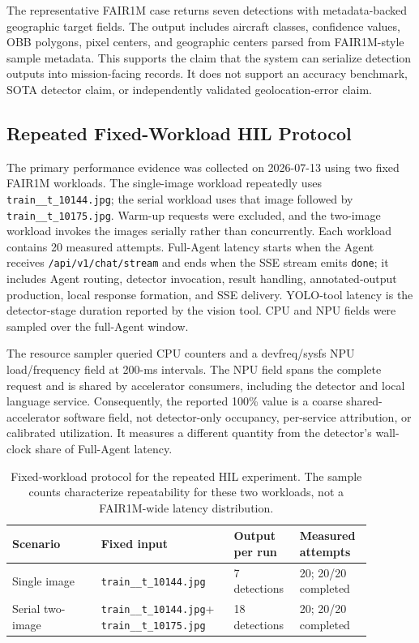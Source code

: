 The representative FAIR1M case returns seven detections with metadata-backed geographic target fields. The output includes aircraft classes, confidence values, OBB polygons, pixel centers, and geographic centers parsed from FAIR1M-style sample metadata. This supports the claim that the system can serialize detection outputs into mission-facing records. It does not support an accuracy benchmark, SOTA detector claim, or independently validated geolocation-error claim.

\subsection{Repeated Fixed-Workload HIL Protocol}

The primary performance evidence was collected on 2026-07-13 using two fixed FAIR1M workloads. The single-image workload repeatedly uses \texttt{train\_\_t\_10144.jpg}; the serial workload uses that image followed by \texttt{train\_\_t\_10175.jpg}. Warm-up requests were excluded, and the two-image workload invokes the images serially rather than concurrently. Each workload contains 20 measured attempts. Full-Agent latency starts when the Agent receives \texttt{/api/v1/chat/stream} and ends when the SSE stream emits \texttt{done}; it includes Agent routing, detector invocation, result handling, annotated-output production, local response formation, and SSE delivery. YOLO-tool latency is the detector-stage duration reported by the vision tool. CPU and NPU fields were sampled over the full-Agent window.

The resource sampler queried CPU counters and a devfreq/sysfs NPU load/frequency field at 200-ms intervals. The NPU field spans the complete request and is shared by accelerator consumers, including the detector and local language service. Consequently, the reported 100\% value is a coarse shared-accelerator software field, not detector-only occupancy, per-service attribution, or calibrated utilization. It measures a different quantity from the detector's wall-clock share of Full-Agent latency.

\begin{table}[htbp]
\centering
\small
\renewcommand{\arraystretch}{1.14}
\setlength{\tabcolsep}{3.5pt}
\caption{Fixed-workload protocol for the repeated HIL experiment. The sample counts characterize repeatability for these two workloads, not a FAIR1M-wide latency distribution.}
\label{tab:fixed_workload_protocol}
\begin{tabular}{p{0.23\linewidth}p{0.30\linewidth}p{0.17\linewidth}p{0.18\linewidth}}
\toprule
\rowcolor{gray!12}
\textbf{Scenario} & \textbf{Fixed input} & \textbf{Output per run} & \textbf{Measured attempts} \\
\midrule
Single image & \texttt{train\_\_t\_10144.jpg} & 7 detections & 20; 20/20 completed \\
\rowcolor{graybg}
Serial two-image & \texttt{train\_\_t\_10144.jpg}\newline + \texttt{train\_\_t\_10175.jpg} & 18 detections & 20; 20/20 completed \\
\bottomrule
\end{tabular}
\end{table}

